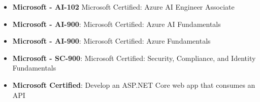 \begin{cvparagraph}
\begin{itemize}
    \item {\textbf{Microsoft - AI-102} Microsoft Certified: Azure AI Engineer Associate}
    \item {\textbf{Microsoft - AI-900}: Microsoft Certified: Azure AI Fundamentals }
    \item {\textbf{{Microsoft - AI-900}}: Microsoft Certified: Azure Fundamentals}
    \item {\textbf{Microsoft - SC-900}: Microsoft Certified: Security, Compliance, and Identity Fundamentals}
    \item {\textbf{Microsoft Certified}: Develop an ASP.NET Core web app that consumes an API}
\end{itemize}
\end{cvparagraph}
